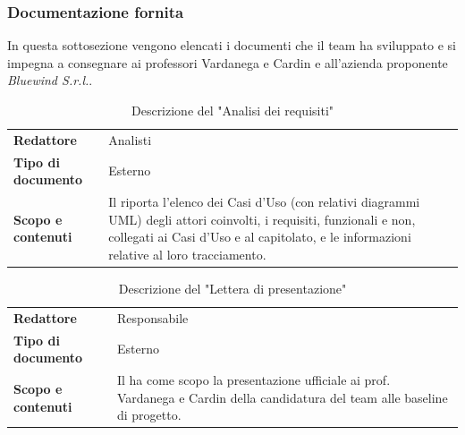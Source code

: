 \documentclass[a4paper,12pt]{article}
\begin{document}
{{        \subsubsection{Documentazione fornita}{
            In questa sottosezione vengono elencati i documenti che il team ha sviluppato e si impegna a consegnare ai professori Vardanega e Cardin e all'azienda proponente \textit{Bluewind S.r.l.}.

            {\renewcommand{\arraystretch}{1.4}
            \begin{table}[h]
            \centering
            \begin{tabularx}{\textwidth}{|l|X|}
                \hline
                \rowcolor{gold}
                \multicolumn{2}{|c|}{\textbf{Analisi dei requisiti}}\\
                \hline
                \textbf{Redattore} & Analisti\\
                \hline
                \textbf{Tipo di documento} & Esterno\\
                \hline
                \textbf{Scopo e contenuti} & Il riporta l'elenco dei Casi d'Uso (con relativi diagrammi UML)  degli attori coinvolti, i requisiti, funzionali e non, collegati ai Casi d'Uso e al capitolato, e le informazioni relative al loro tracciamento.\\
                \hline
            \end{tabularx}
            \caption{Descrizione del "Analisi dei requisiti"}
            \end{table}
            }

            {\renewcommand{\arraystretch}{1.4}
            \begin{table}[H]
            \centering
            \begin{tabularx}{\textwidth}{|l|X|}
                \hline
                \rowcolor{gold}
                \multicolumn{2}{|c|}{\textbf{Lettera di presentazione}}\\
                \hline
                \textbf{Redattore} & Responsabile\\
                \hline
                \textbf{Tipo di documento} & Esterno\\
                \hline
                \textbf{Scopo e contenuti} & Il ha come scopo la presentazione ufficiale ai prof. Vardanega e Cardin della candidatura del team alle baseline di progetto.\\
                \hline
            \end{tabularx}   
            \caption{Descrizione del "Lettera di presentazione"}
            \end{table}
            } 

}}}
\end{document}
